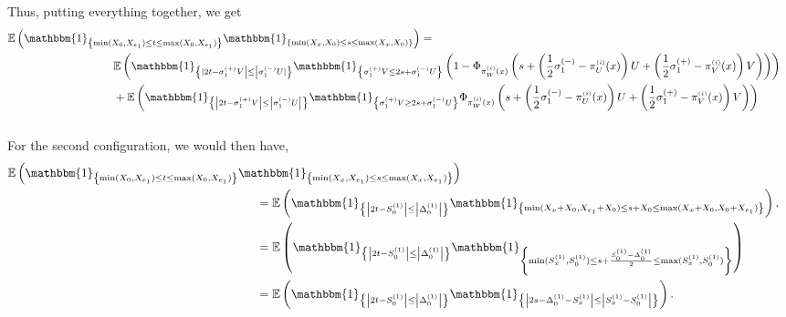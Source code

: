 \documentclass[12pt]{article}
\theoremstyle{Theorem}
\theoremstyle{definition}
\begin{document}
Thus, putting everything together, we get 
{\small 
\begin{align*}
\mathbb{E}\left(\mathbbm{1}_{\left\{\min(X_{\scriptscriptstyle 0}, X_{e_1}) \leq t \leq \max(X_{\scriptscriptstyle 0}, X_{e_1})\right\}}\mathbbm{1}_{\left\{\min(X_{x}, X_{0}) \leq s \leq \max(X_{x}, X_{0}) \right\}}\right) = \\
& \hspace{-10cm} \mathbb{E}\left(\mathbbm{1}_{\left\{|2t - \sigma^{(+)}_{1}V\right| \leq  \left|\sigma^{(-)}_{1}U|\right\}}\mathbbm{1}_{\left\{ \sigma^{(+)}_{1}V  \leq 2s + \sigma^{(-)}_{1}U\right\}} \left(1 - \Phi_{\pi^{\scriptscriptstyle(i)}_{W}(x) }\left(s + \left(\frac{1}{2}\sigma^{(-)}_{1}- \pi^{\scriptscriptstyle(i)}_{U}(x)\right)U  +  \left(\frac{1}{2}\sigma^{(+)}_{1}- \pi^{\scriptscriptstyle(i)}_{V}(x)\right)V\right)\right)\right)\\
& \hspace{-10cm}+ \mathbb{E}\left(\mathbbm{1}_{\left\{\left|2t - \sigma^{(+)}_{1}V\right|\leq  \left|\sigma^{(-)}_{1}U\right|\right\}}\mathbbm{1}_{\left\{ \sigma^{(+)}_{1}V  \geq 2s + \sigma^{(-)}_{1}U\right\}}\Phi_{\pi^{\scriptscriptstyle(i)}_{W}(x) }\left(s + \left(\frac{1}{2}\sigma^{(-)}_{1}- \pi^{\scriptscriptstyle(i)}_{U}(x)\right)U  +  \left(\frac{1}{2}\sigma^{(+)}_{1}- \pi^{\scriptscriptstyle(i)}_{V}(x)\right)V\right) \right)\\\
\end{align*}
}
For the second configuration, we would then have,
{\small
\begin{align*}
\mathbb{E}\left(\mathbbm{1}_{\left\{\min(X_{\scriptscriptstyle 0}, X_{e_1}) \leq t \leq \max(X_{\scriptscriptstyle 0}, X_{e_1})\right\}}\mathbbm{1}_{\left\{\min(X_{\scriptscriptstyle x}, X_{e_1}) \leq s \leq \max(X_{\scriptscriptstyle x}, X_{e_1}) \right\}}\right)\\
& \hspace{-6cm} = \mathbb{E}\left(\mathbbm{1}_{\left\{ \left|2t - S^{\scriptscriptstyle (1)}_{\scriptscriptstyle 0}\right| \leq \left|\Delta^{\scriptscriptstyle (1)}_{\scriptscriptstyle 0}\right|\right\}}\mathbbm{1}_{\left\{\min(X_{\scriptscriptstyle x}+ X_{0}, X_{e_1} + X_{0}) \leq s + X_{0}\leq \max(X_{\scriptscriptstyle x} + X_{0}, X_{0} + X_{e_1}) \right\}}\right). \\
& \hspace{-6cm} = \mathbb{E}\left(\mathbbm{1}_{\left\{ \left|2t - S^{\scriptscriptstyle (1)}_{\scriptscriptstyle 0}\right| \leq \left|\Delta^{\scriptscriptstyle (1)}_{\scriptscriptstyle 0}\right|\right\}}\mathbbm{1}_{\left\{\min(S^{(1)}_{x}, S^{(1)}_{0}) \leq s + \frac{S^{(1)}_{0} - \Delta^{(1)}_{0}}{2}\leq \max(S^{(1)}_{x}, S^{(1)}_{0}) \right\}}\right) \\
& \hspace{-6cm} = \mathbb{E}\left(\mathbbm{1}_{\left\{ \left|2t - S^{\scriptscriptstyle (1)}_{\scriptscriptstyle 0}\right| \leq \left|\Delta^{\scriptscriptstyle (1)}_{\scriptscriptstyle 0}\right|\right\}}\mathbbm{1}_{\left\{ \left|2s - \Delta^{(1)}_{0} -  S^{\scriptscriptstyle (1)}_{x}  \right| \leq \left|S^{\scriptscriptstyle (1)}_{x} - S^{\scriptscriptstyle (1)}_{0}\right|\right\}}\right). 
\end{align*}}
\end{document}
